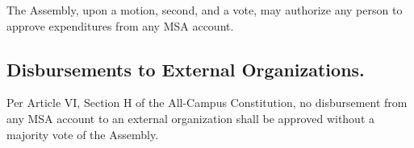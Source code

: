 \subsubsection{}
The Assembly, upon a motion, second, and a vote, may authorize any person to approve expenditures from any MSA account.

\subsection{Disbursements to External Organizations.}
Per Article VI, Section H of the All-Campus Constitution, no disbursement from any MSA account to an external organization shall be approved without a majority vote of the Assembly. 

